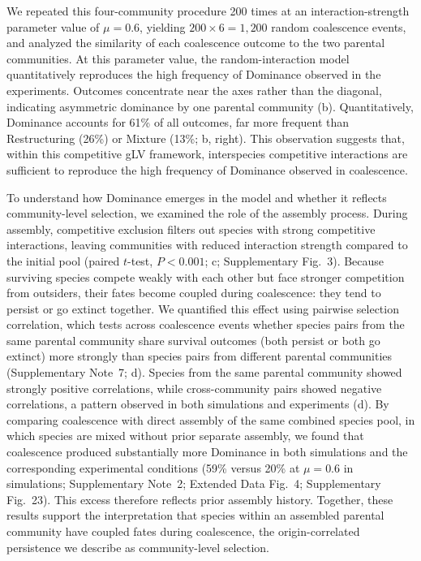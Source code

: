 We repeated this four-community procedure 200 times at an interaction-strength parameter value of $\mu = 0.6$, yielding $200 \times 6 = 1{,}200$ random coalescence events, and analyzed the similarity of each coalescence outcome to the two parental communities. At this parameter value, the random-interaction model quantitatively reproduces the high frequency of Dominance observed in the experiments. Outcomes concentrate near the axes rather than the diagonal, indicating asymmetric dominance by one parental community (b). Quantitatively, Dominance accounts for 61\% of all outcomes, far more frequent than Restructuring (26\%) or Mixture (13\%; b, right). This observation suggests that, within this competitive gLV framework, interspecies competitive interactions are sufficient to reproduce the high frequency of Dominance observed in coalescence.

To understand how Dominance emerges in the model and whether it reflects community-level selection, we examined the role of the assembly process. During assembly, competitive exclusion filters out species with strong competitive interactions, leaving communities with reduced interaction strength compared to the initial pool (paired $t$-test, $P <0.001$; c; Supplementary Fig.~3). Because surviving species compete weakly with each other but face stronger competition from outsiders, their fates become coupled during coalescence: they tend to persist or go extinct together. We quantified this effect using pairwise selection correlation, which tests across coalescence events whether species pairs from the same parental community share survival outcomes (both persist or both go extinct) more strongly than species pairs from different parental communities (Supplementary Note~7; d). Species from the same parental community showed strongly positive correlations, while cross-community pairs showed negative correlations, a pattern observed in both simulations and experiments (d). By comparing coalescence with direct assembly of the same combined species pool, in which species are mixed without prior separate assembly, we found that coalescence produced substantially more Dominance in both simulations and the corresponding experimental conditions (59\% versus 20\% at $\mu = 0.6$ in simulations; Supplementary Note~2; Extended Data Fig.~4; Supplementary Fig.~23). This excess therefore reflects prior assembly history. Together, these results support the interpretation that species within an assembled parental community have coupled fates during coalescence, the origin-correlated persistence we describe as community-level selection.


